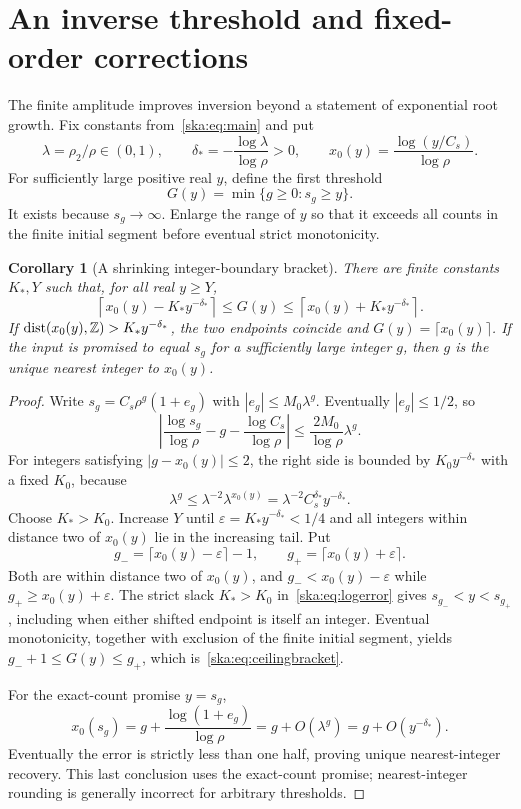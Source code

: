 \documentclass[11pt,letterpaper]{article}
\newtheorem{corollary}[theorem]{Corollary}
\theoremstyle{definition}
\newcommand{\eps}{\varepsilon}\newcommand{\wt}{\operatorname{wt}}
\newcommand{\dist}{\operatorname{dist}}
\begin{document}
\section{An inverse threshold and fixed-order corrections}\label{ska:sec:inverse}
The finite amplitude improves inversion beyond a statement of exponential root growth. Fix constants from~\eqref{ska:eq:main} and put
\begin{equation}\label{ska:eq:inverseparams}
\lambda=\rho_2/\rho\in(0,1),\qquad
\delta_*=-\frac{\log\lambda}{\log\rho}>0,\qquad
x_0(y)=\frac{\log(y/C_s)}{\log\rho}.
\end{equation}
For sufficiently large positive real $y$, define the first threshold
\[
G(y)=\min\{g\ge0:s_g\ge y\}.
\]
It exists because $s_g\to\infty$. Enlarge the range of $y$ so that it exceeds all counts in the finite initial segment before eventual strict monotonicity.

\begin{corollary}[A shrinking integer-boundary bracket]\label{ska:cor:inverse}
There are finite constants $K_*,Y$ such that, for all real $y\ge Y$,
\begin{equation}\label{ska:eq:ceilingbracket}
\left\lceil x_0(y)-K_*y^{-\delta_*}\right\rceil
\le G(y)\le
\left\lceil x_0(y)+K_*y^{-\delta_*}\right\rceil.
\end{equation}
If $\dist(x_0(y),\Z)>K_*y^{-\delta_*}$, the two endpoints coincide and $G(y)=\lceil x_0(y)\rceil$. If the input is promised to equal $s_g$ for a sufficiently large integer $g$, then $g$ is the unique nearest integer to $x_0(y)$.
\end{corollary}
\begin{proof}
Write $s_g=C_s\rho^g(1+e_g)$ with $|e_g|\le M_0\lambda^g$. Eventually $|e_g|\le1/2$, so
\begin{equation}\label{ska:eq:logerror}
\left|\frac{\log s_g}{\log\rho}-g-\frac{\log C_s}{\log\rho}\right|
\le\frac{2M_0}{\log\rho}\lambda^g.
\end{equation}
For integers satisfying $|g-x_0(y)|\le2$, the right side is bounded by $K_0y^{-\delta_*}$ with a fixed $K_0$, because
\[
\lambda^g\le\lambda^{-2}\lambda^{x_0(y)}
=\lambda^{-2}C_s^{\delta_*}y^{-\delta_*}.
\]
Choose $K_*>K_0$. Increase $Y$ until $\eps=K_*y^{-\delta_*}<1/4$ and all integers within distance two of $x_0(y)$ lie in the increasing tail. Put
\[
g_- =\lceil x_0(y)-\eps\rceil-1,
\qquad g_+=\lceil x_0(y)+\eps\rceil.
\]
Both are within distance two of $x_0(y)$, and
$g_-<x_0(y)-\eps$ while $g_+\ge x_0(y)+\eps$.
The strict slack $K_*>K_0$ in~\eqref{ska:eq:logerror} gives $s_{g_-}<y<s_{g_+}$, including when either shifted endpoint is itself an integer. Eventual monotonicity, together with exclusion of the finite initial segment, yields $g_-+1\le G(y)\le g_+$, which is~\eqref{ska:eq:ceilingbracket}.

For the exact-count promise $y=s_g$,
\[
x_0(s_g)=g+\frac{\log(1+e_g)}{\log\rho}
=g+O(\lambda^g)=g+O(y^{-\delta_*}).
\]
Eventually the error is strictly less than one half, proving unique nearest-integer recovery. This last conclusion uses the exact-count promise; nearest-integer rounding is generally incorrect for arbitrary thresholds.
\end{proof}
\end{document}
